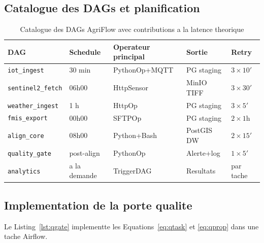 \documentclass[12pt,a4paper]{article}
\theoremstyle{plain}
\theoremstyle{definition}
\theoremstyle{remark}
\begin{document}
	\subsection{Catalogue des DAGs et planification}
	
	\begin{table}[H]
		\caption{Catalogue des DAGs AgriFlow avec contributions a la latence theorique}
		\label{tab:dags}
		\centering\small
		\renewcommand{\arraystretch}{1.35}
		\begin{tabularx}{\linewidth}{lllXl}
			\toprule
			\textbf{DAG} & \textbf{Schedule} & \textbf{Operateur principal} &
			\textbf{Sortie} & \textbf{Retry} \\
			\midrule
			\rowcolor{lightblue!40}
			\texttt{iot\_ingest}      & 30 min & PythonOp+MQTT & PG staging & $3\times10'$ \\
			\texttt{sentinel2\_fetch} & 06h00  & HttpSensor    & MinIO TIFF & $3\times30'$ \\
			\rowcolor{lightblue!40}
			\texttt{weather\_ingest}  & 1 h    & HttpOp        & PG staging & $3\times5'$  \\
			\texttt{fmis\_export}     & 00h00  & SFTPOp        & PG staging & $2\times1$h  \\
			\rowcolor{lightblue!40}
			\texttt{align\_core}      & 08h00  & Python+Bash   & PostGIS DW & $2\times15'$ \\
			\texttt{quality\_gate}    & post-align & PythonOp  & Alerte+log & $1\times5'$  \\
			\rowcolor{lightblue!40}
			\texttt{analytics}        & a la demande & TriggerDAG & Resultats & par tache  \\
			\bottomrule
		\end{tabularx}
	\end{table}
	
	\subsection{Implementation de la porte qualite}
	
	Le Listing~\ref{lst:qgate} implementte les Equations~\eqref{eq:qtask}
	et \eqref{eq:qprop} dans une tache Airflow.
	
\end{document}
